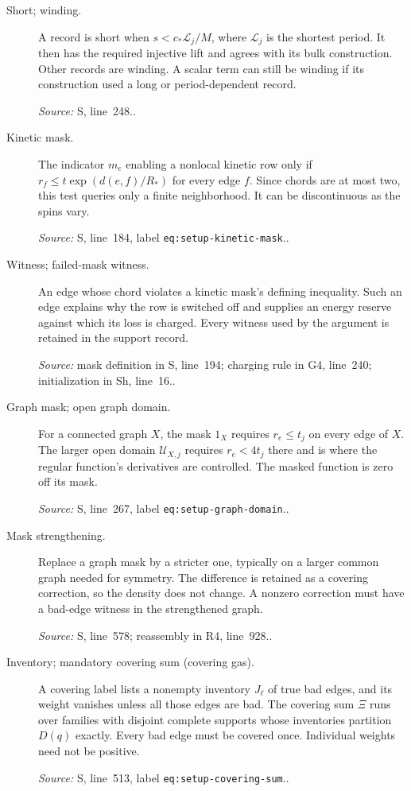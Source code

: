 \documentclass[11pt]{article}
\newcommand{\src}[2]{\textsf{#1}, line~#2}
\newcommand{\where}[1]{\par{\small\textit{Source:} #1.}}
\begin{document}
\begin{description}
\item[Short; winding.]
A record is short when \(s<c_*\mathcal L_j/M\), where
\(\mathcal L_j\) is the shortest period.  It then has the required
injective lift and agrees with its bulk construction.  Other records
are winding.  A scalar term can still be winding if its construction
used a long or period-dependent record.
\where{\src{S}{248}.}

\item[Kinetic mask.]
The indicator \(m_e\) enabling a nonlocal kinetic row only if
\(r_f\le t\exp(d(e,f)/R_*)\) for every edge \(f\).
Since chords are at most two, this test queries only a finite
neighborhood.  It can be discontinuous as the spins vary.
\where{\src{S}{184}, label \texttt{eq:setup-kinetic-mask}.}

\item[Witness; failed-mask witness.]
An edge whose chord violates a kinetic mask's defining inequality.
Such an edge explains why the row is switched off and supplies an
energy reserve against which its loss is charged.  Every witness
used by the argument is retained in the support record.
\where{mask definition in \src{S}{194}; charging rule in \src{G4}{240};
initialization in \src{Sh}{16}.}

\item[Graph mask; open graph domain.]
For a connected graph \(X\), the mask \(1_X\) requires
\(r_e\le t_j\) on every edge of \(X\).  The larger open domain
\(\mathcal U_{X,j}\) requires \(r_e<4t_j\) there and is where the
regular function's derivatives are controlled.  The masked function
is zero off its mask.
\where{\src{S}{267}, label \texttt{eq:setup-graph-domain}.}

\item[Mask strengthening.]
Replace a graph mask by a stricter one, typically on a larger common
graph needed for symmetry.  The difference is retained as a covering
correction, so the density does not change.  A nonzero correction
must have a bad-edge witness in the strengthened graph.
\where{\src{S}{578}; reassembly in \src{R4}{928}.}

\item[Inventory; mandatory covering sum (covering gas).]
A covering label lists a nonempty inventory \(J_\ell\) of true bad
edges, and its weight vanishes unless all those edges are bad.
The covering sum \(\Xi\) runs over families with disjoint complete
supports whose inventories partition \(D(q)\) exactly.  Every bad
edge must be covered once.  Individual weights need not be positive.
\where{\src{S}{513}, label \texttt{eq:setup-covering-sum}.}


\end{description}
\end{document}
